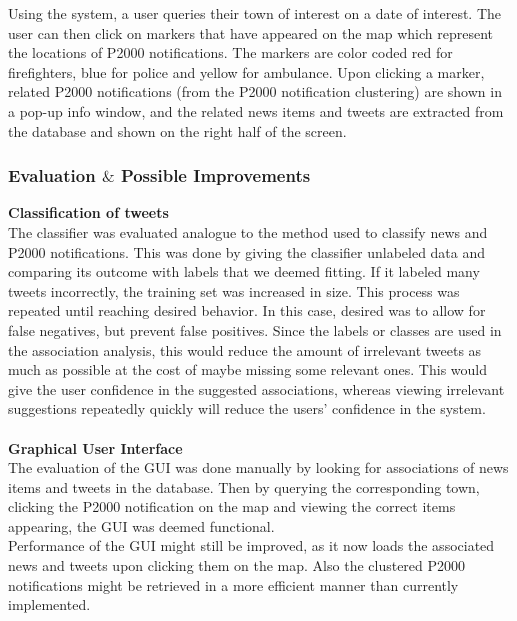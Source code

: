 Using the system, a user queries their town of interest on a date of interest. The user can then click on markers that have appeared on the map which represent the locations of P2000 notifications. The markers are color coded red for firefighters, blue for police and yellow for ambulance. Upon clicking a marker, related P2000 notifications (from the P2000 notification clustering) are shown in a pop-up info window, and the related news items and tweets are extracted from the database and shown on the right half of the screen. \\


\subsubsection*{Evaluation $\&$ Possible Improvements}
\textbf{Classification of tweets}\\
The classifier was evaluated analogue to the method used to classify news and P2000 notifications. This was done by giving the classifier unlabeled data and comparing its outcome with labels that we deemed fitting. If it labeled many tweets incorrectly, the training set was increased in size. This process was repeated until reaching desired behavior. In this case, desired was to allow for false negatives, but prevent false positives. Since the labels or classes are used in the association analysis, this would reduce the amount of irrelevant tweets as much as possible at the cost of maybe missing some relevant ones. This would give the user confidence in the suggested associations, whereas viewing irrelevant suggestions repeatedly quickly will reduce the users' confidence in the system.\\
\\
\textbf{Graphical User Interface}\\
The evaluation of the GUI was done manually by looking for associations of news items and tweets in the database. Then by querying the corresponding town, clicking the P2000 notification on the map and viewing the correct items appearing, the GUI was deemed functional. \\

Performance of the GUI might still be improved, as it now loads the associated news and tweets upon clicking them on the map. Also the clustered P2000 notifications might be retrieved in a more efficient manner than currently implemented. 